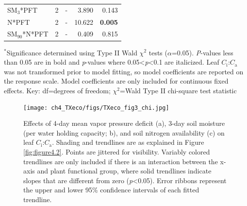 \begin{table}
\begin{tabular}{p{6cm}p{0.5cm}p{2cm}p{1.5cm}p{1.5cm}}
            SM$_{3}$*PFT
            & \multicolumn{1}{r}{2}
            & \multicolumn{1}{r}{-}
            & \multicolumn{1}{r}{3.890}
            & \multicolumn{1}{r}{0.143}
            \\

            N*PFT
            & \multicolumn{1}{r}{2}
            & \multicolumn{1}{r}{-}
            & \multicolumn{1}{r}{10.622}
            & \multicolumn{1}{r}{\textbf{0.005}}
            \\

            SM$_{90}$*N*PFT
            & \multicolumn{1}{r}{2}
            & \multicolumn{1}{r}{-}
            & \multicolumn{1}{r}{0.409}
            & \multicolumn{1}{r}{0.815}
            \\
            \hline
        \end{tabular}%
    \label{tab:table4.3}
\end{table}
\begin{singlespace}
    \noindent $^*$Significance determined using Type II Wald $\chi^{2}$ tests ($\alpha$=0.05). \textit{P}-values less than 0.05 are in bold and \textit{p}-values where 0.05<\textit{p}<0.1 are italicized. Leaf $C_\mathrm{i}$:$C_\mathrm{a}$ was not transformed prior to model fitting, so model coefficients are reported on the response scale. Model coefficients are only included for continuous fixed effects. Key: df=degrees of freedom; $\chi^2$=Wald Type II chi-square test statistic
\end{singlespace}
\clearpage

\newpage
\begin{figure}
    \centering
    \texttt{[image: ch4\_TXeco/figs/TXeco\_fig3\_chi.jpg]}
    \caption[Effects of 4-day mean vapor pressure deficit, 3-day soil moisture (per water holding capacity), and soil nitrogen availability on leaf $C_\mathrm{i}$:$C_\mathrm{a}$]{Effects of 4-day mean vapor pressure deficit (a), 3-day soil moisture (per water holding capacity; b), and soil nitrogen availability (c) on leaf $C_\mathrm{i}$:$C_\mathrm{a}$. Shading and trendlines are as explained in Figure \ref{fig:figure4.2}. Points are jittered for visibility. Variably colored trendlines are only included if there is an interaction between the x-axis and plant functional group, where solid trendlines indicate slopes that are different from zero (\textit{p}<0.05). Error ribbons represent the upper and lower 95\% confidence intervals of each fitted trendline.}
    \label{fig:figure4.3}
\end{figure}
\clearpage

